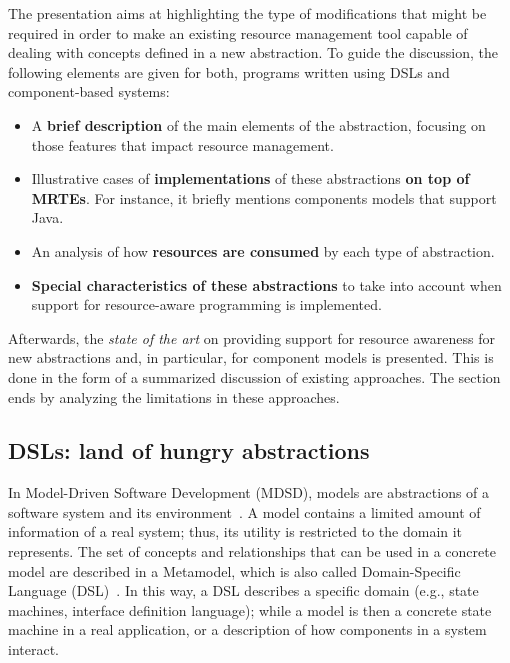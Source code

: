 The presentation aims at highlighting the type of modifications that might be required in order to make an existing resource management tool capable of dealing with concepts defined in a new abstraction.
To guide the discussion, the following elements are given for both, programs written using DSLs and component-based systems:
\begin{itemize}
\item A \textbf{brief description} of the main elements of the abstraction, focusing on those features that impact resource management. 

\item Illustrative cases of \textbf{implementations} of these abstractions \textbf{on top of MRTEs}.
For instance, it briefly mentions components models that support Java.

\item An analysis of how \textbf{resources are consumed} by each type of abstraction.

\item \textbf{Special characteristics of these abstractions} to take into account when support for resource-aware programming is implemented.     


\end{itemize}

Afterwards, the \textit{state of the art} on providing support for resource awareness for new abstractions and, in particular, for component models is presented.
This is done in the form of a summarized discussion of existing approaches. 
The section ends by analyzing the limitations in these approaches. 


\subsection{DSLs: land of hungry abstractions} \label{sec:DSL-on-MRTEs}

In Model-Driven Software Development (MDSD), models are abstractions of a software system and its environment~\cite{Stahl:2006:MSD:1196766, Fowler:2010:DSL:1809745}.
A model contains a limited amount of information of a real system; thus, its utility is restricted to the domain it represents.
The set of concepts and relationships that can be used in a concrete model are described in a Metamodel, which is also called Domain-Specific Language (DSL)~\cite{Fowler:2010:DSL:1809745}.
In this way, a DSL describes a specific domain (e.g., state machines, interface definition language); while a model is then a concrete state machine in a real application, or a description of how components in a system interact.


